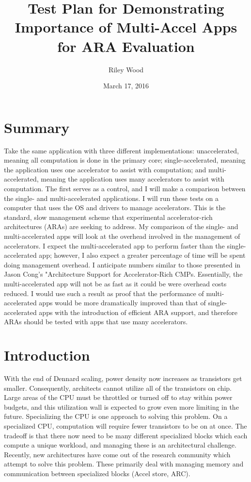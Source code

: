 \documentclass{article}
\title{Test Plan for Demonstrating Importance of Multi-Accel Apps for ARA Evaluation}
\author{Riley Wood}
\date{March 17, 2016}
\begin{document}
\maketitle
\section*{Summary}
Take the same application with three different implementations: unaccelerated, meaning all computation is done in the primary core; single-accelerated, meaning the application uses one accelerator to assist with computation; and multi-accelerated, meaning the application uses many accelerators to assist with computation. The first serves as a control, and I will make a comparison between the single- and multi-accelerated applications. I will run these tests on a computer that uses the OS and drivers to manage accelerators. This is the standard, slow management scheme that experimental accelerator-rich architectures (ARAs) are seeking to address. My comparison of the single- and multi-accelerated apps will look at the overhead involved in the management of accelerators. I expect the multi-accelerated app to perform faster than the single-accelerated app; however, I also expect a greater percentage of time will be spent doing management overhead. I anticipate numbers similar to those presented in Jason Cong's "Architecture Support for Accelerator-Rich CMPs. Essentially, the multi-accelerated app will not be as fast as it could be were overhead costs reduced. I would use such a result as proof that the performance of multi-accelerated apps would be more dramatically improved than that of single-accelerated apps with the introduction of efficient ARA support, and therefore ARAs should be tested with apps that use many accelerators.
\section{Introduction}
With the end of Dennard scaling, power density now increases as transistors get smaller. Consequently, architects cannot utilize all of the transistors on chip. Large areas of the CPU must be throttled or turned off to stay within power budgets, and this utilization wall is expected to grow even more limiting in the future. Specializing the CPU is one approach to solving this problem. On a specialized CPU, computation will require fewer transistors to be on at once. The tradeoff is that there now need to be many different specialized blocks which each compute a unique workload, and managing these is an architectural challenge. Recently, new architectures have come out of the research community which attempt to solve this problem. These primarily deal with managing memory and communication between specialized blocks (Accel store, ARC).
\end{document}

